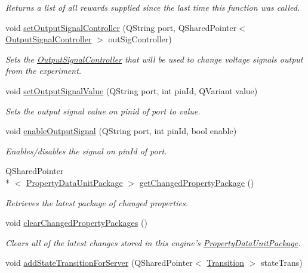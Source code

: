 \begin{DoxyCompactItemize}
\begin{DoxyCompactList}\small\item\em Returns a list of all rewards supplied since the last time this function was called. \end{DoxyCompactList}\item 
void \hyperlink{class_picto_1_1_engine_1_1_picto_engine_a85277be62e49ced7649e0ba8396e3b98}{set\-Output\-Signal\-Controller} (Q\-String port, Q\-Shared\-Pointer$<$ \hyperlink{class_picto_1_1_output_signal_controller}{Output\-Signal\-Controller} $>$ out\-Sig\-Controller)
\begin{DoxyCompactList}\small\item\em Sets the \hyperlink{class_picto_1_1_output_signal_controller}{Output\-Signal\-Controller} that will be used to change voltage signals output from the experiment. \end{DoxyCompactList}\item 
void \hyperlink{class_picto_1_1_engine_1_1_picto_engine_a0afa6a09eeff345338d31f5bce636976}{set\-Output\-Signal\-Value} (Q\-String port, int pin\-Id, Q\-Variant value)
\begin{DoxyCompactList}\small\item\em Sets the output signal value on pinid of port to value. \end{DoxyCompactList}\item 
void \hyperlink{class_picto_1_1_engine_1_1_picto_engine_a1352e9ea6b17431546775c19a75d95e5}{enable\-Output\-Signal} (Q\-String port, int pin\-Id, bool enable)
\begin{DoxyCompactList}\small\item\em Enables/disables the signal on pin\-Id of port. \end{DoxyCompactList}\item 
Q\-Shared\-Pointer\\*
$<$ \hyperlink{class_picto_1_1_property_data_unit_package}{Property\-Data\-Unit\-Package} $>$ \hyperlink{class_picto_1_1_engine_1_1_picto_engine_ab55955373ab32442382f678ea35166c6}{get\-Changed\-Property\-Package} ()
\begin{DoxyCompactList}\small\item\em Retrieves the latest package of changed properties. \end{DoxyCompactList}\item 
void \hyperlink{class_picto_1_1_engine_1_1_picto_engine_af758bde0051ea8be3a939e6471ebf093}{clear\-Changed\-Property\-Packages} ()
\begin{DoxyCompactList}\small\item\em Clears all of the latest changes stored in this engine's \hyperlink{class_picto_1_1_property_data_unit_package}{Property\-Data\-Unit\-Package}. \end{DoxyCompactList}\item 
\hypertarget{class_picto_1_1_engine_1_1_picto_engine_a5879ccdce584c3e65f6a6508b2b67d03}{void \hyperlink{class_picto_1_1_engine_1_1_picto_engine_a5879ccdce584c3e65f6a6508b2b67d03}{add\-State\-Transition\-For\-Server} (Q\-Shared\-Pointer$<$ \hyperlink{class_picto_1_1_transition}{Transition} $>$ state\-Trans)}\label{class_picto_1_1_engine_1_1_picto_engine_a5879ccdce584c3e65f6a6508b2b67d03}


\end{DoxyCompactItemize}
